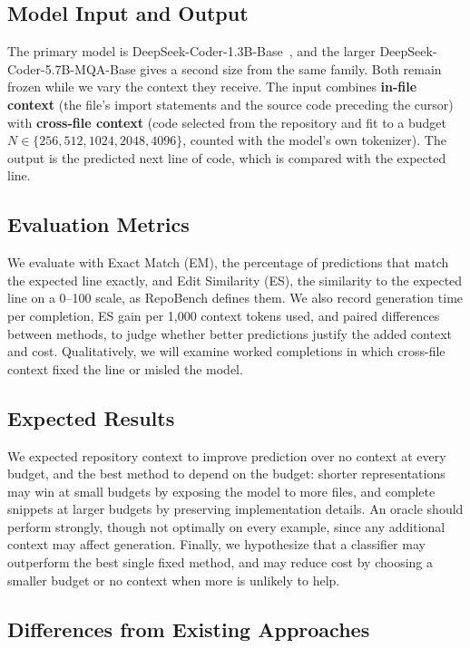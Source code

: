 \documentclass[10pt,twocolumn,letterpaper]{article}
\begin{document}
\subsection{Model Input and Output}

The primary model is DeepSeek-Coder-1.3B-Base~\cite{guo2024deepseekcoder}, and the larger
DeepSeek-Coder-5.7B-MQA-Base gives a second size from the same family. Both remain frozen
while we vary the context they receive. The input combines \textbf{in-file context} (the
file's import statements and the source code preceding the cursor) with \textbf{cross-file
context} (code selected from the repository and fit to a budget
$N \in \{256, 512, 1024, 2048, 4096\}$, counted with the model's own tokenizer). The output
is the predicted next line of code, which is compared with the expected line.

\subsection{Evaluation Metrics}

We evaluate with Exact Match (EM), the percentage of predictions that match the expected line
exactly, and Edit Similarity (ES), the similarity to the expected line on a 0--100 scale, as
RepoBench defines them. We also record generation time per completion, ES gain per 1,000
context tokens used, and paired differences between methods, to judge whether better
predictions justify the added context and cost. Qualitatively, we will examine worked
completions in which cross-file context fixed the line or misled the model.

\subsection{Expected Results}

We expected repository context to improve prediction over no context at every budget, and the
best method to depend on the budget: shorter representations may win at small budgets by
exposing the model to more files, and complete snippets at larger budgets by preserving
implementation details. An oracle should perform strongly, though not optimally on every
example, since any additional context may affect generation. Finally, we hypothesize that a
classifier may outperform the best single fixed method, and may reduce cost by choosing a
smaller budget or no context when more is unlikely to help.

\subsection{Differences from Existing Approaches}
\end{document}
